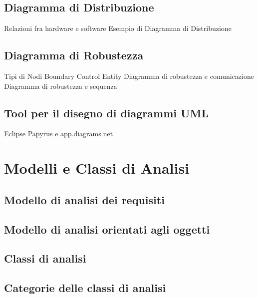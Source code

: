 \documentclass{article}
\begin{document}
	\subsection{Diagramma di Distribuzione}
	Relazioni fra hardware e software
	Esempio di Diagramma di Distribuzione
	\subsection{Diagramma di Robustezza}
	Tipi di Nodi
	Boundary
	Control
	Entity
	Diagramma di robustezza e comunicazione
	Diagramma di robustezza e sequenza
	\subsection{Tool per il disegno di diagrammi UML}
	Eclipse Papyrus e app.diagrams.net
	
	\section{Modelli e Classi di Analisi}
	\subsection{Modello di analisi dei requisiti}
	\subsection{Modello di analisi orientati agli oggetti}
	\subsection{Classi di analisi}
	\subsection{Categorie delle classi di analisi}
\end{document}
